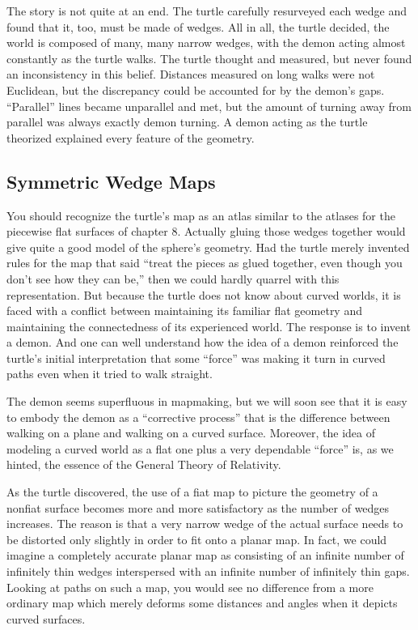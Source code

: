 \documentclass{book}
\begin{document}
The story is not quite at an end. The turtle carefully resurveyed
each wedge and found that it, too, must be made of wedges. All in
all, the turtle decided, the world is composed of many, many narrow
wedges, with the demon acting almost constantly as the turtle walks.
The turtle thought and measured, but never found an inconsistency in
this belief. Distances measured on long walks were not Euclidean, but
the discrepancy could be accounted for by the demon's gaps. ``Parallel''
lines became unparallel and met, but the amount of turning away from
parallel was always exactly demon turning. A demon acting as the turtle
theorized explained every feature of the geometry.

\subsection{Symmetric Wedge Maps}

You should recognize the turtle's map as an atlas similar to the atlases
for the piecewise flat surfaces of chapter 8. Actually gluing those wedges
together would give quite a good model of the sphere's geometry. Had
the turtle merely invented rules for the map that said ``treat the pieces as glued together, even though you don't see how they can be,'' then
we could hardly quarrel with this representation. But because the turtle
does not know about curved worlds, it is faced with a conflict between
maintaining its familiar flat geometry and maintaining the connectedness
of its experienced world. The response is to invent a demon. And one
can well understand how the idea of a demon reinforced the turtle's
initial interpretation that some ``force'' was making it turn in curved
paths even when it tried to walk straight.

The demon seems superfluous in mapmaking, but we will soon see
that it is easy to embody the demon as a ``corrective process'' that is the
difference between walking on a plane and walking on a curved surface.
Moreover, the idea of modeling a curved world as a flat one plus a very
dependable ``force'' is, as we hinted, the essence of the General Theory
of Relativity.

As the turtle discovered, the use of a fiat map to picture the geometry
of a nonfiat surface becomes more and more satisfactory as the number
of wedges increases. The reason is that a very narrow wedge of the
actual surface needs to be distorted only slightly in order to fit onto a
planar map. In fact, we could imagine a completely accurate planar map
as consisting of an infinite number of infinitely thin wedges interspersed
with an infinite number of infinitely thin gaps. Looking at paths on
such a map, you would see no difference from a more ordinary map
which merely deforms some distances and angles when it depicts curved
surfaces.
\end{document}
